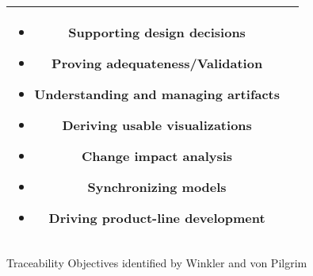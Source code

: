 \begin{figure}
\begin{tabular}{|c|c|}
\begin{minipage}[t][][c]{0.5\textwidth}
\begin{itemize}
\item Supporting design decisions
\item Proving adequateness/Validation
\item Understanding and managing artifacts
\item Deriving usable visualizations
\item Change impact analysis
\item Synchronizing models
\item Driving product-line development

\end{itemize}
\vspace{0.1cm}
\end{minipage}

\\\hline

\end{tabular}
\caption{Traceability Objectives identified by Winkler and von Pilgrim \cite{TraceabilitySurvey}}
\label{fig:TraceabilityObjectives}
\end{figure}